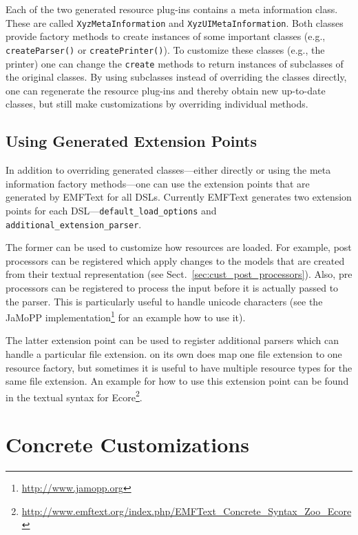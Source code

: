 Each of the two generated resource plug-ins contains a meta information class.
These are called \texttt{XyzMetaInformation} and \texttt{XyzUIMetaInformation}.
Both classes provide factory methods to create instances of some important
classes (e.g., \texttt{createParser()} or \texttt{createPrinter()}). To
customize these classes (e.g., the printer) one can change the \texttt{create}
methods to return instances of subclasses of the original classes. By using
subclasses instead of overriding the classes directly, one can regenerate the
resource plug-ins and thereby obtain new up-to-date classes, but still make
customizations by overriding individual methods.

\subsection{Using Generated Extension Points}
\label{sec:using_generated_extension_points}

In addition to overriding generated classes---either directly or using the meta
information factory methods---one can use the extension points that are
generated by EMFText for all DSLs. Currently EMFText generates two extension 
points for each DSL---\texttt{default\_load\_options} and
\texttt{additional\_extension\_parser}.

The former can be used to customize how resources are loaded. For example, post
processors can be registered which apply changes to the models that are created
from their textual representation (see Sect.~\ref{sec:cust_post_processors}).
Also, pre processors can be registered to process the input before it is
actually passed to the parser. This is particularly useful to handle unicode
characters (see the JaMoPP implementation\footnote{\url{http://www.jamopp.org}}
for an example how to use it).

The latter extension point can be used to register additional parsers which can
handle a particular file extension. \EMF on its own does map one file extension
to one resource factory, but sometimes it is useful to have multiple
resource types for the same file extension. An example for how to use this
extension point can be found in the textual syntax for
Ecore\footnote{\url{http://www.emftext.org/index.php/EMFText_Concrete_Syntax_Zoo_Ecore}}.

\section{Concrete Customizations}

